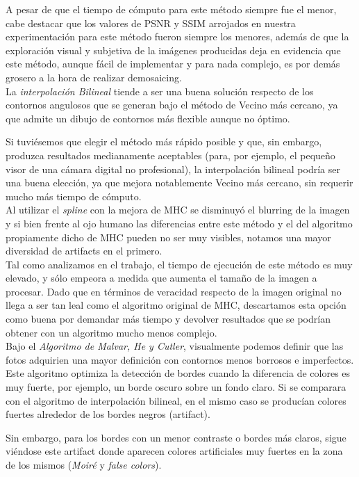 \documentclass[a4paper]{article}
\begin{document}
A pesar de que el tiempo de cómputo para este método siempre fue el menor, cabe destacar que los valores de PSNR y SSIM arrojados en nuestra experimentaci\'on para este m\'etodo fueron siempre los menores, además de que la exploración visual y subjetiva de la imágenes producidas deja en evidencia que este método, aunque fácil de implementar y para nada complejo, es por demás grosero a la hora de realizar demosaicing.\\

La \textit{interpolaci\'on Bilineal} tiende a ser una buena soluci\'on respecto de los contornos angulosos que se generan bajo el m\'etodo de Vecino m\'as cercano, ya que admite un dibujo de contornos m\'as flexible aunque no \'optimo.

Si tuviésemos que elegir el método más rápido posible y que, sin embargo, produzca resultados medianamente aceptables (para, por ejemplo, el pequeño visor de una cámara digital no profesional), la interpolación bilineal podría ser una buena elección, ya que mejora notablemente Vecino más cercano, sin requerir mucho más tiempo de cómputo.\\

Al utilizar el \textit{spline} con la mejora de MHC se disminuy\'o el blurring de la imagen y si bien frente al ojo humano las diferencias entre este m\'etodo y el del algoritmo propiamente dicho de MHC pueden no ser muy visibles, notamos una mayor diversidad de artifacts en el primero. \\
Tal como analizamos en el trabajo, el tiempo de ejecuci\'on de este m\'etodo es muy elevado, y sólo empeora a medida que aumenta el tama\~no de la imagen a procesar. Dado que en t\'erminos de veracidad respecto de la imagen original no llega a ser tan leal como el algoritmo original de MHC, descartamos esta opci\'on como buena por demandar m\'as tiempo y devolver resultados que se podrían obtener con un algoritmo mucho menos complejo.\\

Bajo el \textit{Algoritmo de Malvar, He y Cutler}, visualmente podemos definir que las fotos adquirien una mayor definici\'on con contornos menos borrosos e imperfectos. Este algoritmo optimiza la detecci\'on de bordes cuando la diferencia de colores es muy fuerte, por ejemplo, un borde oscuro sobre un fondo claro. Si se comparara con el algoritmo de interpolaci\'on bilineal, en el mismo caso se produc\'ian colores fuertes alrededor de los bordes negros (artifact).

Sin embargo, para los bordes con un menor contraste o bordes m\'as claros, sigue vi\'endose este artifact donde aparecen colores artificiales muy fuertes en la zona de los mismos (\textit{Moiré} y \textit{false colors}).\\
\end{document}
